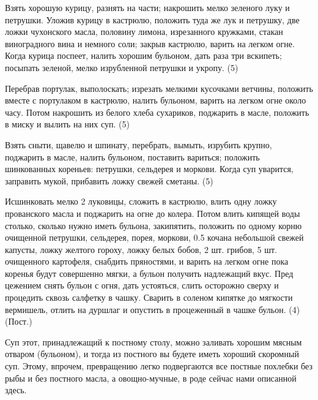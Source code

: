 
Взять хорошую курицу, разнять на части; накрошить мелко зеленого луку и петрушки. Уложив курицу в кастрюлю, положить туда же лук и петрушку, две ложки чухонского масла, половину лимона, изрезанного кружками, стакан виноградного вина и немного соли; закрыв кастрюлю, варить на легком огне. Когда курица поспеет, налить хорошим бульоном, дать раза три вскипеть; посыпать зеленой, мелко изрубленной петрушки и укропу. (5)


Перебрав портулак, выполоскать; изрезать мелкими кусочками ветчины, положить вместе с портулаком в кастрюлю, налить бульоном, варить на легком огне около часу. Потом накрошить из белого хлеба сухариков, поджарить в масле, положить в миску и вылить на них суп. (5)


Взять сныти, щавелю и шпинату, перебрать, вымыть, изрубить крупно, поджарить в масле, налить бульоном, поставить вариться; положить шинкованных кореньев: петрушки, сельдерея и моркови. Когда суп уварится, заправить мукой, прибавить ложку свежей сметаны. (5)


Исшинковать мелко 2 луковицы, сложить в кастрюлю, влить одну ложку прованского масла и поджарить на огне до колера. Потом влить кипящей воды столько, сколько нужно иметь бульона, закипятить, положить по одному корню очищенной петрушки, сельдерея, порея, моркови, 0.5 кочана небольшой свежей капусты, ложку желтого гороху, ложку белых бобов, 2 шт. грибов, 5 шт. очищенного картофеля, снабдить пряностями, и варить на легком огне пока коренья будут совершенно мягки, а бульон получить надлежащий вкус. Пред цежением снять бульон с огня, дать устояться, слить осторожно сверху и процедить сквозь салфетку в чашку. Сварить в соленом кипятке до мягкости вермишель, отлить на дуршлаг и опустить в процеженный в чашке бульон. (4) (Пост.)

Суп этот, принадлежащий к постному столу, можно заливать хорошим мясным отваром (бульоном), и тогда из постного вы будете иметь хороший скоромный суп. Этому, впрочем, превращению легко подвергаются все постные похлебки без рыбы и без постного масла, а овощно-мучные, в роде сейчас нами описанной здесь.


